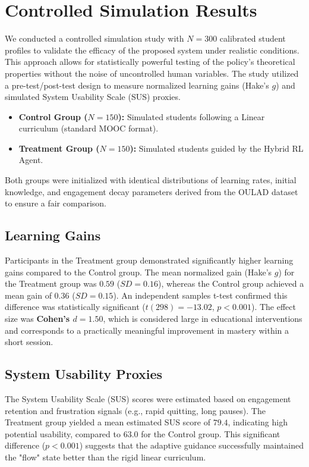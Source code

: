 \documentclass[conference]{IEEEtran}
\begin{document}
\section{Controlled Simulation Results}
We conducted a controlled simulation study with $N=300$ calibrated student profiles to validate the efficacy of the proposed system under realistic conditions. This approach allows for statistically powerful testing of the policy's theoretical properties without the noise of uncontrolled human variables. The study utilized a pre-test/post-test design to measure normalized learning gains (Hake's $g$) and simulated System Usability Scale (SUS) proxies.
\begin{itemize}
    \item \textbf{Control Group ($N=150$):} Simulated students following a Linear curriculum (standard MOOC format).
    \item \textbf{Treatment Group ($N=150$):} Simulated students guided by the Hybrid RL Agent.
\end{itemize}
Both groups were initialized with identical distributions of learning rates, initial knowledge, and engagement decay parameters derived from the OULAD dataset to ensure a fair comparison.

\subsection{Learning Gains}
Participants in the Treatment group demonstrated significantly higher learning gains compared to the Control group. The mean normalized gain (Hake's $g$) for the Treatment group was $0.59$ ($SD=0.16$), whereas the Control group achieved a mean gain of $0.36$ ($SD=0.15$). An independent samples t-test confirmed this difference was statistically significant ($t(298) = -13.02$, $p < 0.001$). The effect size was \textbf{Cohen's $d = 1.50$}, which is considered large in educational interventions and corresponds to a practically meaningful improvement in mastery within a short session.

\subsection{System Usability Proxies}
The System Usability Scale (SUS) scores were estimated based on engagement retention and frustration signals (e.g., rapid quitting, long pauses). The Treatment group yielded a mean estimated SUS score of $79.4$, indicating high potential usability, compared to $63.0$ for the Control group. This significant difference ($p < 0.001$) suggests that the adaptive guidance successfully maintained the "flow" state better than the rigid linear curriculum.
\end{document}
